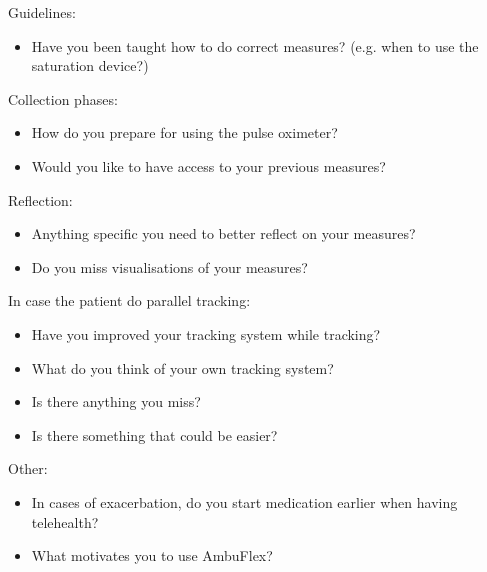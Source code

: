 Guidelines:
\begin{itemize}
\item Have you been taught how to do correct measures? (e.g. when to use the saturation device?) %
\end{itemize}

Collection phases:
\begin{itemize}
\item How do you prepare for using the pulse oximeter?%
\item Would you like to have access to your previous measures?%
\end{itemize}

Reflection:
\begin{itemize}
\item Anything specific you need to better reflect on your measures?%
\item Do you miss visualisations of your measures?%
\end{itemize}

In case the patient do parallel tracking:
\begin{itemize}
\item Have you improved your tracking system while tracking? %
\item What do you think of your own tracking system?%
\item Is there anything you miss?%
\item Is there something that could be easier?%
\end{itemize}

Other:
\begin{itemize}
\item In cases of exacerbation, do you start medication earlier when having telehealth?%
\item What motivates you to use AmbuFlex?%
\end{itemize}

